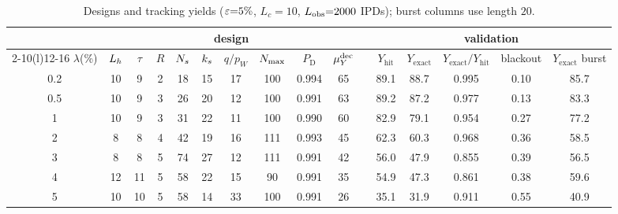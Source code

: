 \begin{table}[t]
\centering\footnotesize
\setlength{\tabcolsep}{4.2pt}
\caption{Designs and tracking yields ($\varepsilon{=}5\%$, $L_c{=}10$, $L_{\mathrm{obs}}{=}2000$ IPDs); burst columns use length $20$.}
\label{tab:main}
\begin{tabular}{@{}c ccccccccc c ccccc@{}}
\toprule
& \multicolumn{9}{c}{design} & & \multicolumn{5}{c}{validation} \\
\cmidrule(r){2-10}\cmidrule(l){12-16}
$\lambda$(\%) & $L_h$ & $\tau$ & $R$ & $N_s$ & $k_s$ & $q/p_W$ & $N_{\max}$ & $P_{\mathrm{D}}$ & $\mu_Y^{\mathrm{dec}}$ & & $Y_{\mathrm{hit}}$ & $Y_{\mathrm{exact}}$ & $Y_{\mathrm{exact}}/Y_{\mathrm{hit}}$ & blackout & $Y_{\mathrm{exact}}$ burst \\
\midrule
0.2 & 10 & 9 & 2 & 18 & 15 & 17 & 100 & 0.994 & 65 & & 89.1 & 88.7 & 0.995 & 0.10 & 85.7 \\
0.5 & 10 & 9 & 3 & 26 & 20 & 12 & 100 & 0.991 & 63 & & 89.2 & 87.2 & 0.977 & 0.13 & 83.3 \\
1 & 10 & 9 & 3 & 31 & 22 & 11 & 100 & 0.990 & 60 & & 82.9 & 79.1 & 0.954 & 0.27 & 77.2 \\
2 & 8 & 8 & 4 & 42 & 19 & 16 & 111 & 0.993 & 45 & & 62.3 & 60.3 & 0.968 & 0.36 & 58.5 \\
3 & 8 & 8 & 5 & 74 & 27 & 12 & 111 & 0.991 & 42 & & 56.0 & 47.9 & 0.855 & 0.39 & 56.5 \\
4 & 12 & 11 & 5 & 58 & 22 & 15 & 90 & 0.991 & 35 & & 54.9 & 47.3 & 0.861 & 0.38 & 59.6 \\
5 & 10 & 10 & 5 & 58 & 14 & 33 & 100 & 0.991 & 26 & & 35.1 & 31.9 & 0.911 & 0.55 & 40.9 \\
\bottomrule
\end{tabular}
\end{table}
